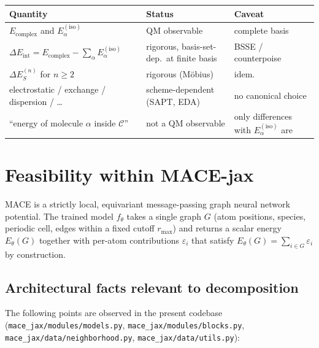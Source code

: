 \documentclass[11pt,a4paper]{article}
\newcommand{\Eint}{\Delta E_{\mathrm{int}}}
\newcommand{\Eiso}{E^{(\mathrm{iso})}}
\newcommand{\Ecpl}{E_{\mathrm{complex}}}
\newcommand{\rmax}{r_{\mathrm{max}}}
\begin{document}
\begin{table}[h]
\centering
\renewcommand{\arraystretch}{1.15}
\begin{tabular}{lll}
\toprule
Quantity & Status & Caveat \\
\midrule
$\Ecpl$ and $\Eiso_\alpha$            & QM observable               & complete basis \\
$\Eint = \Ecpl - \sum_\alpha \Eiso_\alpha$ & rigorous, basis-set-dep.\ at finite basis & BSSE / counterpoise \\
$\Delta E^{(n)}_{S}$ for $n \ge 2$    & rigorous (M\"obius)         & idem. \\
electrostatic / exchange / dispersion / \ldots & scheme-dependent (SAPT, EDA) & no canonical choice \\
``energy of molecule $\alpha$ inside $\mathcal{C}$'' & not a QM observable    & only differences with $\Eiso_\alpha$ are \\
\bottomrule
\end{tabular}
\end{table}

\section{Feasibility within \textsc{MACE}-jax}

\textsc{MACE} is a strictly local, equivariant message-passing graph neural
network potential. The trained model $f_\theta$ takes a single graph
$G$ (atom positions, species, periodic cell, edges within a fixed cutoff
$\rmax$) and returns a scalar energy $E_\theta(G)$ together with per-atom
contributions $\varepsilon_i$ that satisfy
$E_\theta(G) = \sum_{i \in G} \varepsilon_i$ by construction.

\subsection{Architectural facts relevant to decomposition}

The following points are observed in the present codebase
(\texttt{mace\_jax/modules/models.py}, \texttt{mace\_jax/modules/blocks.py},
\texttt{mace\_jax/data/neighborhood.py}, \texttt{mace\_jax/data/utils.py}):
\end{document}

